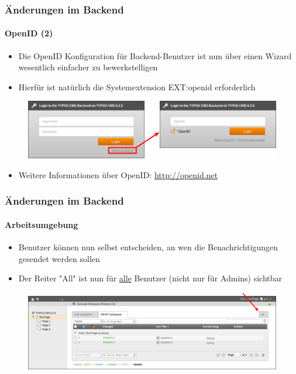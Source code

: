
\begin{frame}[fragile]
	\frametitle{Änderungen im Backend}
	\framesubtitle{OpenID (2)}

 	\begin{itemize}
		\item Die OpenID Konfiguration für Backend-Benutzer ist nun über einen Wizard wesentlich einfacher zu bewerkstelligen
		\item Hierfür ist natürlich die Systemextension EXT:openid erforderlich
	\end{itemize}

	\begin{figure}
		\includegraphics[width=0.8\linewidth]{Images/BackendChanges/OpenIdLogin.png}
	\end{figure}

 	\begin{itemize}
		\item Weitere Informationen über OpenID:\newline
			\small\url{http://openid.net}\normalsize
	\end{itemize}

\end{frame}


\begin{frame}[fragile]
	\frametitle{Änderungen im Backend}
	\framesubtitle{Arbeitsumgebung}

 	\begin{itemize}
 		\item Benutzer können nun selbst entscheiden, an wen die Benachrichtigungen gesendet werden sollen
		\item Der Reiter "All" ist nun für \underline{alle} Benutzer (nicht nur für Admins) sichtbar
	\end{itemize}

	\begin{figure}
		\includegraphics[width=0.95\linewidth]{Images/BackendChanges/WorkspacesTabAll.png}
	\end{figure}

\end{frame}


